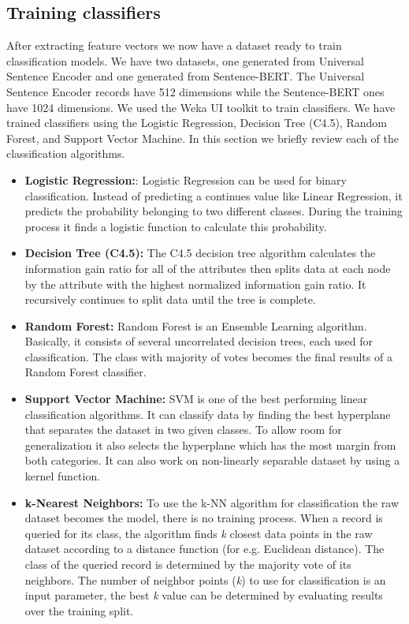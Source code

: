 \documentclass[conference]{IEEEtran}
\begin{document}
\subsection{Training classifiers}
After extracting feature vectors we now have a dataset ready to train classification models. We have two datasets,
one generated from Universal Sentence Encoder and one generated from Sentence-BERT. The Universal Sentence Encoder
records have 512 dimensions while the Sentence-BERT ones have 1024 dimensions. We used the Weka UI toolkit 
\cite{10.1145/1656274.1656278} to train classifiers. We have trained classifiers using the Logistic Regression, 
Decision Tree (C4.5), Random Forest, and Support Vector Machine. In this section we briefly review each of the 
classification algorithms.
\begin{itemize}
  \item\textbf{Logistic Regression:}: Logistic Regression can be used for binary classification. Instead of 
  predicting a continues value like Linear Regression, it predicts the probability belonging to two different 
  classes. During the training process it finds a logistic function to calculate this probability.
  \item\textbf{Decision Tree (C4.5):} The C4.5 decision tree algorithm calculates the information gain ratio 
  for all of the attributes then splits data at each node by the attribute with the highest normalized 
  information gain ratio. It recursively continues to split data until the tree is complete.
  \item\textbf{Random Forest:} Random Forest is an Ensemble Learning algorithm. Basically, it consists of several 
  uncorrelated decision trees, each used for classification. The class with majority of votes becomes 
  the final results of a Random Forest classifier.
  \item\textbf{Support Vector Machine:} SVM is one of the best performing linear classification algorithms. It can 
  classify data by finding the best hyperplane that separates the dataset in two given classes. To allow 
  room for generalization it also selects the hyperplane which has the most margin from both categories. It can 
  also work on non-linearly separable dataset by using a kernel function.
  \item\textbf{k-Nearest Neighbors:} To use the k-NN algorithm for classification the raw dataset becomes the model,
  there is no training process. When a record is queried for its class, the algorithm finds \textit{k} closest 
  data points in the raw dataset according to a distance function (for e.g. Euclidean distance). The class of 
  the queried record is determined by the majority vote of its neighbors. The number of neighbor 
  points (\textit{k}) to use for classification is an input parameter, the best \textit{k} value can be 
  determined by evaluating results over the training split.
\end{itemize}
\end{document}
